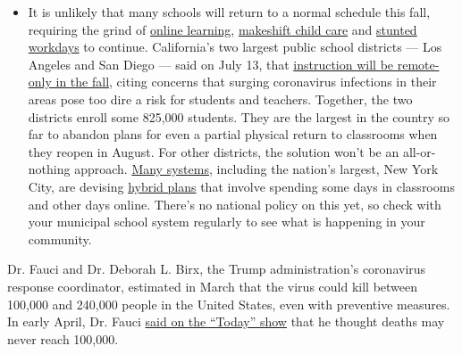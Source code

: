 \begin{itemize}
  \begin{itemize}
  \tightlist
  \item
    It is unlikely that many schools will return to a normal schedule
    this fall, requiring the grind of
    \href{https://www.nytimes3xbfgragh.onion/2020/06/05/us/coronavirus-education-lost-learning.html?action=click\&pgtype=Article\&state=default\&region=MAIN_CONTENT_3\&context=storylines_faq}{online
    learning},
    \href{https://www.nytimes3xbfgragh.onion/2020/05/29/us/coronavirus-child-care-centers.html?action=click\&pgtype=Article\&state=default\&region=MAIN_CONTENT_3\&context=storylines_faq}{makeshift
    child care} and
    \href{https://www.nytimes3xbfgragh.onion/2020/06/03/business/economy/coronavirus-working-women.html?action=click\&pgtype=Article\&state=default\&region=MAIN_CONTENT_3\&context=storylines_faq}{stunted
    workdays} to continue. California's two largest public school
    districts --- Los Angeles and San Diego --- said on July 13, that
    \href{https://www.nytimes3xbfgragh.onion/2020/07/13/us/lausd-san-diego-school-reopening.html?action=click\&pgtype=Article\&state=default\&region=MAIN_CONTENT_3\&context=storylines_faq}{instruction
    will be remote-only in the fall}, citing concerns that surging
    coronavirus infections in their areas pose too dire a risk for
    students and teachers. Together, the two districts enroll some
    825,000 students. They are the largest in the country so far to
    abandon plans for even a partial physical return to classrooms when
    they reopen in August. For other districts, the solution won't be an
    all-or-nothing approach.
    \href{https://bioethics.jhu.edu/research-and-outreach/projects/eschool-initiative/school-policy-tracker/}{Many
    systems}, including the nation's largest, New York City, are
    devising
    \href{https://www.nytimes3xbfgragh.onion/2020/06/26/us/coronavirus-schools-reopen-fall.html?action=click\&pgtype=Article\&state=default\&region=MAIN_CONTENT_3\&context=storylines_faq}{hybrid
    plans} that involve spending some days in classrooms and other days
    online. There's no national policy on this yet, so check with your
    municipal school system regularly to see what is happening in your
    community.
  \end{itemize}
\end{itemize}

Dr. Fauci and Dr. Deborah L. Birx, the Trump administration's
coronavirus response coordinator, estimated in March that the virus
could kill between 100,000 and 240,000 people in the United States, even
with preventive measures. In early April, Dr. Fauci
\href{https://www.today.com/video/dr-anthony-fauci-virus-death-toll-may-be-more-like-60-000-than-100-000-to-200-000-81825861735}{said
on the ``Today'' show} that he thought deaths may never reach 100,000.


